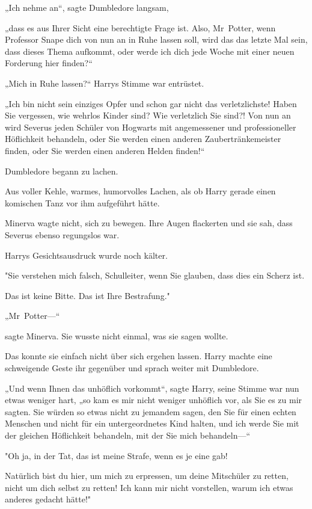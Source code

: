 {„Ich nehme an“, sagte Dumbledore langsam,

„dass es aus Ihrer Sicht eine berechtigte Frage ist. Also, Mr~Potter, wenn Professor Snape dich von nun an in Ruhe lassen soll, wird das das letzte Mal sein, dass dieses Thema aufkommt, oder werde ich dich jede Woche mit einer neuen Forderung hier finden?“

„Mich in Ruhe lassen?“ Harrys Stimme war entrüstet.

„Ich bin nicht sein einziges Opfer und schon gar nicht das verletzlichste! Haben Sie vergessen, wie wehrlos Kinder sind? Wie verletzlich Sie sind?! Von nun an wird Severus jeden Schüler von Hogwarts mit angemessener und professioneller Höflichkeit behandeln, oder Sie werden einen anderen Zaubertränkemeister finden, oder Sie werden einen anderen Helden finden!“

Dumbledore begann zu lachen.

Aus voller Kehle, warmes, humorvolles Lachen, als ob Harry gerade einen komischen Tanz vor ihm aufgeführt hätte.

Minerva wagte nicht, sich zu bewegen. Ihre Augen flackerten und sie sah, dass Severus ebenso regungslos war.

Harrys Gesichtsausdruck wurde noch kälter.

"Sie verstehen mich falsch, Schulleiter, wenn Sie glauben, dass dies ein Scherz ist.

Das ist keine Bitte. Das ist Ihre Bestrafung."

„Mr~Potter—“

sagte Minerva. Sie wusste nicht einmal, was sie sagen wollte.

Das konnte sie einfach nicht über sich ergehen lassen. Harry machte eine schweigende Geste ihr gegenüber und sprach weiter mit Dumbledore.

„Und wenn Ihnen das unhöflich vorkommt“, sagte Harry, seine Stimme war nun etwas weniger hart, „so kam es mir nicht weniger unhöflich vor, als Sie es zu mir sagten. Sie würden so etwas nicht zu jemandem sagen, den Sie für einen echten Menschen und nicht für ein untergeordnetes Kind halten, und ich werde Sie mit der gleichen Höflichkeit behandeln, mit der Sie mich behandeln—“

"Oh ja, in der Tat, das ist meine Strafe, wenn es je eine gab!

Natürlich bist du hier, um mich zu erpressen, um deine Mitschüler zu retten, nicht um dich selbst zu retten! Ich kann mir nicht vorstellen, warum ich etwas anderes gedacht hätte!"

}
